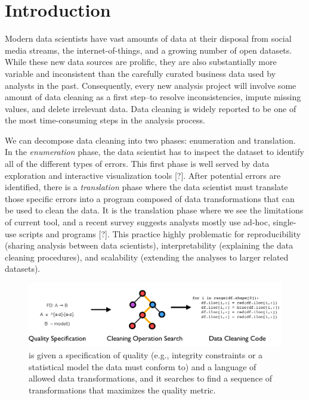 \section{Introduction}\label{intro}\sloppy
Modern data scientists have vast amounts of data at their disposal from social media streams, the internet-of-things, and a growing number of open datasets.
While these new data sources are prolific, they are also substantially more variable and inconsistent than the carefully curated business data used by analysts in the past.
Consequently, every new analysis project will involve some amount of data cleaning as a first step--to resolve inconsistencies, impute missing values, and delete irrelevant data.
Data cleaning is widely reported to be one of the most time-consuming steps in the analysis process.

We can decompose data cleaning into two phases: enumeration and translation. 
In the \emph{enumeration} phase, the data scientist has to inspect the dataset to identify all of the different types of errors.
This first phase is well served by data exploration and interactive visualization tools [?].
After potential errors are identified, there is a \emph{translation} phase where the data scientist must translate those specific errors into a program composed of data transformations that can be used to clean the data.
It is the translation phase where we see the limitations of current tool, and a recent survey suggests analysts mostly use ad-hoc, single-use scripts and programs [?]. 
This practice highly problematic for reproducibility (sharing analysis between data scientists), interpretability (explaining the  data cleaning procedures),  and  scalability (extending the analyses to larger related datasets).

\begin{figure}[t]
\centering
 \includegraphics[width=\columnwidth]{figures/intro.png}
 \caption{ \sys is given a specification of quality (e.g., integrity constraints or a statistical model the data must conform to) and a language  of  allowed  data  transformations,  and  it  searches  to find a sequence of transformations that maximizes the quality metric. }
\end{figure}

